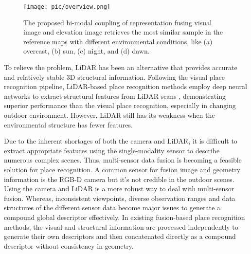 \documentclass[letterpaper, 10 pt, conference]{ieeeconf}  \usepackage{tabularx}
\begin{document}
\begin{figure}[tp]
	\centering
	\texttt{[image: pic/overview.png]}

	\caption{ The proposed bi-modal coupling of representation fusing visual image and elevation image retrieves the most similar sample in the reference maps with different environmental conditions, like (a) overcast, (b) sun, (c) night, and (d) dawn.}
	\label{environment}
	\vspace{-10pt}
\end{figure}

To relieve the problem, LiDAR has been an alternative that provides accurate and relatively stable 3D structural information. Following the visual place recognition pipeline, LiDAR-based place recognition methods employ deep neural networks to extract structural features from LiDAR scans \cite{liu2019lpd, angelina2018pointnetvlad}, demonstrating superior performance than the visual place recognition, especially in changing outdoor environment. However, LiDAR still has its weakness when the environmental structure has fewer features.

Due to the inherent shortages of both the camera and LiDAR, it is difficult to extract appropriate features using the single-modality sensor to describe numerous complex scenes. Thus, multi-sensor data fusion is becoming a feasible solution for place recognition. A common sensor for fusion image and geometry information is the RGB-D camera but it's not credible in the outdoor scenes. Using the camera and LiDAR is a more robust way to deal with multi-sensor fusion. Whereas, inconsistent viewpoints, diverse observation ranges and data structures of the different sensor data become major issues to generate a compound global descriptor effectively. In existing fusion-based place recognition methods, the visual and structural information are processed independently to generate their own descriptors and then concatenated directly as a compound descriptor without consistency in geometry.
\end{document}

